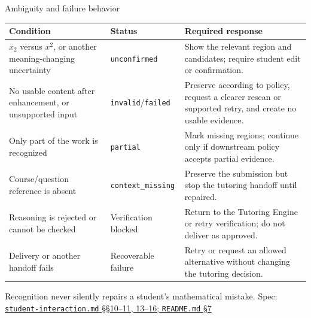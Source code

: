 \documentclass[aspectratio=169,10pt]{beamer}
\newcommand{\specnote}[2]{%
  \vfill\hfill{\tiny\color{Muted}Spec: \href{run:../../specs/#1}{\texttt{#1} #2}}}
\begin{document}
\begin{frame}{Ambiguity and failure behavior}
\scriptsize
\begin{tabularx}{\textwidth}{@{}P{.27\textwidth}P{.20\textwidth}Y@{}}
\toprule
\textbf{Condition} & \textbf{Status} & \textbf{Required response} \\
\midrule
$x_2$ versus $x^2$, or another meaning-changing uncertainty & \texttt{unconfirmed} & Show the relevant region and candidates; require student edit or confirmation. \\
\addlinespace
No usable content after enhancement, or unsupported input & \texttt{invalid}/\texttt{failed} & Preserve according to policy, request a clearer rescan or supported retry, and create no usable evidence. \\
\addlinespace
Only part of the work is recognized & \texttt{partial} & Mark missing regions; continue only if downstream policy accepts partial evidence. \\
\addlinespace
Course/question reference is absent & \texttt{context\_missing} & Preserve the submission but stop the tutoring handoff until repaired. \\
\addlinespace
Reasoning is rejected or cannot be checked & Verification blocked & Return to the Tutoring Engine or retry verification; do not deliver as approved. \\
\addlinespace
Delivery or another handoff fails & Recoverable failure & Retry or request an allowed alternative without changing the tutoring decision. \\
\bottomrule
\end{tabularx}
\vspace{.4em}
\centering
\alert{Recognition never silently repairs a student's mathematical mistake.}
\specnote{student-interaction.md}{\S\S10--11, 13--16; \texttt{README.md} \S7}
\end{frame}
\end{document}
